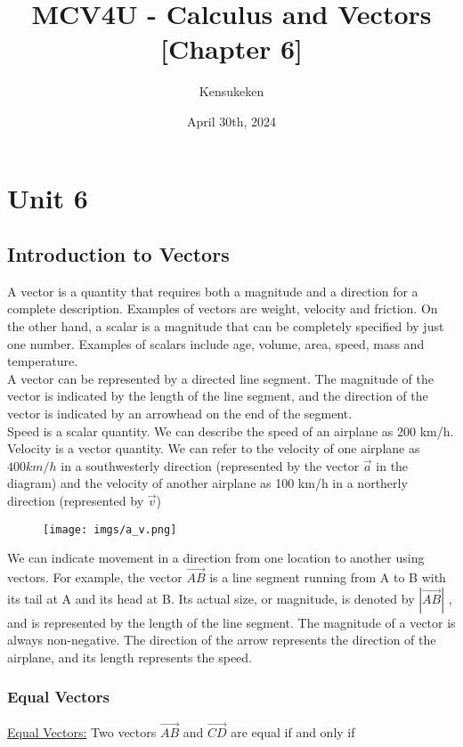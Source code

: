 \documentclass{article}
\title{MCV4U - Calculus and Vectors [Chapter 6]}
\author{Kensukeken}
\date{April 30th, 2024}
\begin{document}
\maketitle

\tableofcontents
\newpage
\section{Unit 6}
\subsection{Introduction to Vectors}
A vector is a quantity that requires both a magnitude and a direction for a complete description.  Examples of vectors are weight, velocity and friction.  On the other hand, a scalar is a magnitude that can be completely specified by just one number.  Examples of scalars include age, volume, area, speed, mass and temperature.\\


A vector can be represented by a directed line segment.  The magnitude of the vector is indicated by the length of the line segment, and the direction of the vector is indicated by an arrowhead on the end of the segment.\\


Speed is a scalar quantity. We can describe the speed of an airplane as 200 km/h.\\


Velocity is a vector quantity. We can refer to the velocity of one airplane as $400 km/h$ in a southwesterly direction (represented by the vector $\vec{a}$ in the diagram) and the velocity of another airplane as 100 km/h in a northerly direction (represented by $\Vec{v}$)\\
\begin{figure}[h]
    \centering
    \texttt{[image: imgs/a\_v.png]}
\end{figure}

We can indicate movement in a direction from one location to another using vectors. For example, the vector $\overrightarrow{AB}$ is a line segment running from A to B with its tail at A and its head at B. Its actual size, or magnitude, is denoted by $|\overrightarrow{AB}|$ , and is represented by the length of the line segment. The magnitude of a vector is always non-negative. The direction of the arrow represents the direction of the airplane, and its length represents the speed.
\newpage
\subsubsection{Equal Vectors}
\underline{Equal Vectors:}
Two vectors $\overrightarrow{AB}$ and $\overrightarrow{CD}$ are equal if and only if\\
\end{document}
